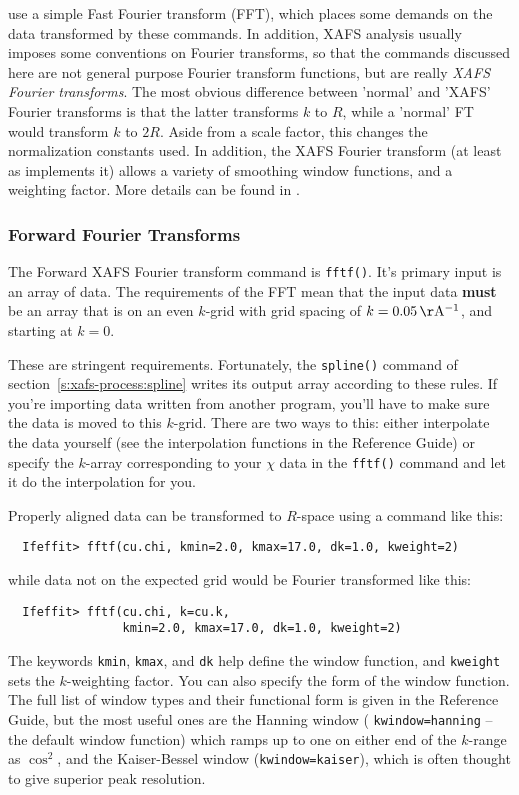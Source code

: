 \documentclass[11pt]{article}
\begin{document}
{\ifeffit} use a simple Fast Fourier transform (FFT), which places some
demands on the data transformed by these commands.  In addition, XAFS
analysis usually imposes some conventions on Fourier transforms, so that
the commands discussed here are not general purpose Fourier transform
functions, but are really {\emph{XAFS Fourier transforms}}.  The most
obvious difference between 'normal' and 'XAFS' Fourier transforms is that
the latter transforms $k$ to $R$, while a 'normal' FT would transform $k$
to $2R$.  Aside from a scale factor, this changes the normalization
constants used. In addition, the XAFS Fourier transform (at least as
{\ifeffit} implements it) allows a variety of smoothing window functions,
and a weighting factor.  More details can be found in {\XAIBook}.

\subsubsection{Forward Fourier Transforms}\label{s:xafs-process:fftf}

The Forward XAFS Fourier transform command is {\tt{fftf()}}.  It's primary
input is an array of {\chik} data.  The requirements of the FFT mean that
the input {\chik} data {\bf{must}} be an array that is on an even $k$-grid
with grid spacing of $k = 0.05 \rm\, \AA^{-1}$, and starting at $k=0$.

These are stringent requirements.  Fortunately, the {\tt{spline()}} command
of section~\ref{s:xafs-process:spline} writes its output {\chik} array
according to these rules.  If you're importing {\chik} data written from
another program, you'll have to make sure the data is moved to this
$k$-grid.  There are two ways to this: either interpolate the data yourself
(see the interpolation functions in the Reference Guide) or specify the
$k$-array corresponding to your $\chi$ data in the {\tt{fftf()}} command
and let it do the interpolation for you.

Properly aligned {\chik} data can be transformed to $R$-space using a
command like this:
{\small\begin{verbatim}
  Ifeffit> fftf(cu.chi, kmin=2.0, kmax=17.0, dk=1.0, kweight=2)
\end{verbatim}}\noindent
while data not on the expected grid would be Fourier transformed like this:
{\small\begin{verbatim}
  Ifeffit> fftf(cu.chi, k=cu.k,
                kmin=2.0, kmax=17.0, dk=1.0, kweight=2)
\end{verbatim}
}\noindent
The keywords {\tt{kmin}}, {\tt{kmax}}, and {\tt{dk}} help define the window
function, and {\tt{kweight}} sets the $k$-weighting factor.  You can also
specify the form of the window function.  The full list of window types and
their functional form is given in the Reference Guide, but the most useful
ones are the Hanning window ( {\tt{kwindow=hanning}} -- the default
window function) which ramps up to one on either end of the $k$-range as
$\cos^2$, and the Kaiser-Bessel window ({\tt{kwindow=kaiser}}), which is
often thought to give superior peak resolution.
\end{document}
